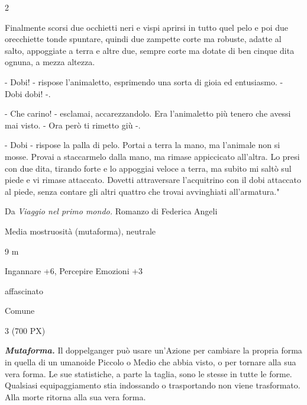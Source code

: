 \begin{multicols}{2}
{Finalmente scorsi due occhietti neri e vispi aprirsi in tutto quel pelo e poi due orecchiette tonde spuntare, quindi due zampette corte ma robuste, adatte al salto, appoggiate a terra e altre due, sempre corte ma dotate di ben cinque dita ognuna, a mezza altezza.

- Dobi! - rispose l'animaletto, esprimendo una sorta di gioia ed entusiasmo. - Dobi dobi! -.

- Che carino! - esclamai, accarezzandolo. Era l'animaletto più tenero che avessi mai visto. - Ora però ti rimetto giù -.

- Dobi - rispose la palla di pelo.
Portai a terra la mano, ma l'animale non si mosse. Provai a staccarmelo dalla mano, ma rimase appiccicato all'altra. Lo presi con due dita, tirando forte e lo appoggiai veloce a terra, ma subito mi saltò sul piede e vi rimase attaccato. Dovetti attraversare l'acquitrino con il dobi attaccato al piede, senza contare gli altri quattro che trovai avvinghiati all'armatura."


Da \emph{Viaggio nel primo mondo.} Romanzo di Federica Angeli

\begin{description}[noitemsep, topsep=0pt, parsep=0pt, partopsep=0pt, itemsep=1pt, leftmargin=2.35cm,  labelwidth=2.2cm, itemindent=0cm, listparindent=0pt] %
\setlength{\baselineskip}{10pt}
\item[\textbf{Taglia/Tipo}] Media mostruosità (mutaforma), neutrale
\item[\textbf{Caratt.}] 
\item[\textbf{Punti Ferita}] 
\item[\textbf{Movimento}] 9 m
\item[\textbf{Tiri Salvez.}] 
\item[\textbf{Comp.}] Ingannare +6, Percepire Emozioni +3
\item[\textbf{Immunità}] affascinato
\item[\textbf{Sensi}] 
\item[\textbf{Linguaggi}] Comune
\item[\textbf{Sfida}] 3 (700 PX)
\end{description}
\smallskip

\emph{\textbf{Mutaforma.}} Il doppelganger può usare un'Azione per cambiare la propria forma in quella di un umanoide Piccolo o Medio che abbia visto, o per tornare alla sua vera forma. Le sue statistiche, a parte la taglia, sono le stesse in tutte le forme. Qualsiasi equipaggiamento stia indossando o trasportando non viene trasformato. Alla morte ritorna alla sua vera forma.

}
\end{multicols}
